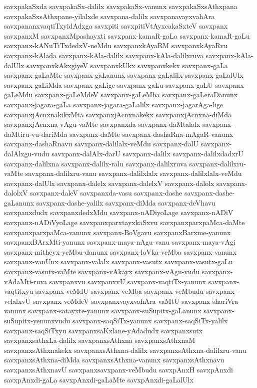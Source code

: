 {savxpakaSxda
savxpakaSx-dalilx
savxpakaSx-vanunx
savxpakaSxsAthxpana
savxpakaSxsAthxpane-yilalxde
savxpana-dalilx
savxpanavayxvahAra
savxpananxvaqtiTxyidAdxga
savxpiti
savxpitiVtAyxcakaSxteV
savxpanx
savxpanxM
savxpanxMpashayxti
savxpanx-kamaR-gaLa
savxpanx-kamaR-gaLu
savxpanx-kANuTiTxdedxV-neMdu
savxpanxkAyaRM
savxpanxkAyaRvu
savxpanx-kAlada
savxpanx-kAla-dalilx
savxpanx-kAla-dalilxruva
savxpanx-kAla-dalUlx
savxpanxkAkxgiyeV
savxpanxkUkx
savxpanxkekx
savxpanx-gaLa
savxpanx-gaLaMte
savxpanx-gaLanunx
savxpanx-gaLalilx
savxpanx-gaLalUlx
savxpanx-gaLiMda
savxpanx-gaLige
savxpanx-gaLu
savxpanx-gaLU
savxpanx-gaLeMdu
savxpanx-gaLeMdeV
savxpanx-gaLeMba
savxpanx-gaLeraDanunx
savxpanx-jagara-gaLa
savxpanx-jagara-gaLalilx
savxpanx-jagarAga-lige
savxpanxjAcnxnakikxMta
savxpanxjAcnxnakekx
savxpanxjAcnxna-diMda
savxpanxjAcnxna-vAgu-vaMte
savxpanxda
savxpanx-daMtalalx
savxpanx-daMtiru-vu-dariMda
savxpanx-daMte
savxpanx-dashaRna-mAgaR-vanunx
savxpanx-dashaRnavu
savxpanx-dalilalx-veMdu
savxpanx-dalU
savxpanx-dalAlxgu-vudu
savxpanx-dalAlx-darU
savxpanx-dalilx
savxpanx-dalilxdadxrU
savxpanx-dalilxna
savxpanx-dalilx-ralu
savxpanx-dalilxruva
savxpanx-dalilxru-vaMte
savxpanx-dalilxru-vanu
savxpanx-dalilxlalx
savxpanx-dalilxlalx-veMdu
savxpanx-dalUlx
savxpanx-dalelx
savxpanx-dalelxV
savxpanx-dalolx
savxpanx-dalolxV
savxpanx-daleV
savxpanxda-vasu
savxpanx-dashe
savxpanx-dashe-gaLanunx
savxpanx-dashe-yalilx
savxpanx-diMda
savxpanx-deVhavu
savxpanxdudx
savxpanxdedxMdu
savxpanx-nADiyoLage
savxpanx-nADiV
savxpanx-nADiVyoLage
savxpanxparxtayxkaSxvu
savxpanxparxpaMca-daMte
savxpanxparxpaMca-vanunx
savxpanx-BoVgavu
savxpanxBarxme-yanunx
savxpanxBArxMti-yanunx
savxpanx-maya-nAgu-vanu
savxpanx-maya-vAgi
savxpanx-mitheyx-yeMbu-danunx
savxpanx-loVka-veMba
savxpanx-vanunx
savxpanx-vanUnx
savxpanx-valalx
savxpanx-vasutx
savxpanx-vasutx-gaLu
savxpanx-vasutx-vaMte
savxpanx-vAkayx
savxpanx-vAgu-vudu
savxpanx-vAdaMti-ruva
savxpanxvu
savxpanxvU
savxpanx-vaqtiTx-yanunx
savxpanx-vaqtitxyu
savxpanx-veMdU
savxpanx-veMba
savxpanx-veMbudu
savxpanx-velalxvU
savxpanx-voMdeV
savxpanxvayxvahAra-vaMtU
savxpanx-shariVra-vanunx
savxpanx-satayxte-yanunx
savxpanx-suSupitx-gaLanunx
savxpanx-suSupitx-yenunxvudu
savxpanx-saqSiTx-yanunx
savxpanx-saqSiTx-yalilx
savxpanx-saqSiTxyu
savxpanxsaKxlane-yAdadudx
savxpanxsutx
savxpanxsathxLa-dalilx
savxpanxsAthxna
savxpanxsAthxnaM
savxpanxsAthxnakekx
savxpanxsAthxna-dalilx
savxpanxsAthxna-dalilxru-vanu
savxpanxsAthxna-diMda
savxpanxsAthxna-vanunx
savxpanxsAthxnavu
savxpanxsAthxnavU
savxpanxsavxpanx-veMbudu
savxpAnxH
savxpAnxdi
savxpAnxdi-gaLa
savxpAnxdi-gaLaMte
savxpAnxdi-gaLalUlx
}
